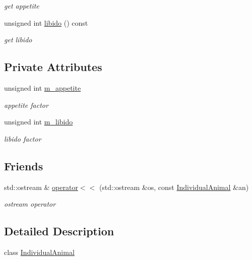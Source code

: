 \begin{DoxyCompactItemize}
\begin{DoxyCompactList}\small\item\em get appetite \end{DoxyCompactList}\item 
\hypertarget{classIndividualAnimal_ac245ea10d23617781d639622bd65d75d}{
unsigned int \hyperlink{classIndividualAnimal_ac245ea10d23617781d639622bd65d75d}{libido} () const }
\label{classIndividualAnimal_ac245ea10d23617781d639622bd65d75d}

\begin{DoxyCompactList}\small\item\em get libido \end{DoxyCompactList}\end{DoxyCompactItemize}
\subsection*{Private Attributes}
\begin{DoxyCompactItemize}
\item 
unsigned int \hyperlink{classIndividualAnimal_a1ffbeb4d91923e91679c96f1e45e5071}{m\_\-appetite}
\begin{DoxyCompactList}\small\item\em appetite factor \end{DoxyCompactList}\item 
unsigned int \hyperlink{classIndividualAnimal_a60d160394b92b61685a63f3c91164938}{m\_\-libido}
\begin{DoxyCompactList}\small\item\em libido factor \end{DoxyCompactList}\end{DoxyCompactItemize}
\subsection*{Friends}
\begin{DoxyCompactItemize}
\item 
std::ostream \& \hyperlink{classIndividualAnimal_abaf2e3cb53c5c0004f0fa218ab980965}{operator$<$$<$} (std::ostream \&os, const \hyperlink{classIndividualAnimal}{IndividualAnimal} \&an)
\begin{DoxyCompactList}\small\item\em ostream operator \end{DoxyCompactList}\end{DoxyCompactItemize}


\subsection{Detailed Description}
class \hyperlink{classIndividualAnimal}{IndividualAnimal} 

